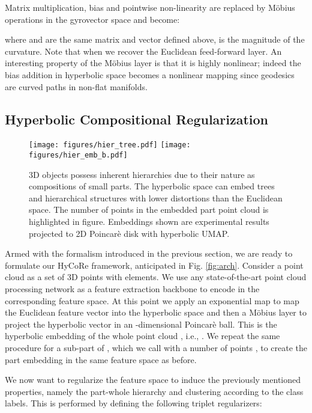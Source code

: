 \documentclass{article}
\begin{document}
Matrix multiplication, bias and pointwise non-linearity are replaced by M\"{o}bius operations in the gyrovector space and become:

where  and  are the same matrix and vector defined above,  is the magnitude of the curvature. Note that when  we recover the Euclidean feed-forward layer. An interesting property of the M\"{o}bius layer is that it is highly nonlinear; indeed the bias addition in hyperbolic space becomes a nonlinear mapping since geodesics are curved paths in non-flat manifolds.


\subsection{Hyperbolic Compositional Regularization}

\begin{figure}
  \centering
    \texttt{[image: figures/hier\_tree.pdf]}
    \qquad
    \texttt{[image: figures/hier\_emb\_b.pdf]}
  \caption{3D objects possess inherent hierarchies due to their nature as compositions of small parts. The hyperbolic space can embed trees and hierarchical structures with lower distortions than the Euclidean space. The number of points in the embedded part point cloud is highlighted in figure. Embeddings shown are experimental results projected to 2D Poincarè disk with hyperbolic UMAP.}
  \label{fig:tree}
\end{figure}


Armed with the formalism introduced in the previous section, we are ready to formulate our HyCoRe framework, anticipated in Fig. \ref{fig:arch}.
Consider a point cloud  as a set of 3D points  with  elements. We use any state-of-the-art point cloud processing network as a feature extraction backbone  to encode  in the corresponding feature space. At this point we apply an exponential map  to map the Euclidean feature vector into the hyperbolic space and then a M\"{o}bius layer   to project the hyperbolic vector in an -dimensional Poincarè ball. This is the hyperbolic embedding of the whole point cloud , i.e., . We repeat the same procedure for a sub-part of , which we call  with a number of points , to create the part embedding  in the same feature space as before.

We now want to regularize the feature space to induce the previously mentioned properties, namely the part-whole hierarchy and clustering according to the class labels. This is performed by defining the following triplet regularizers:
\end{document}
